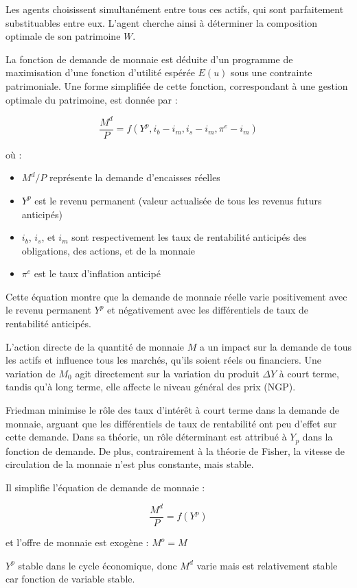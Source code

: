 \documentclass[a4paper, 12pt]{report}
\begin{document}
Les agents choisissent simultanément entre tous ces actifs, qui sont parfaitement substituables entre eux. L'agent cherche ainsi à déterminer la composition optimale de son patrimoine \( W \).

La fonction de demande de monnaie est déduite d'un programme de maximisation d'une fonction d'utilité espérée $E(u)$ sous une contrainte patrimoniale. Une forme simplifiée de cette fonction, correspondant à une gestion optimale du patrimoine, est donnée par :

$$\frac{M^d}{P} = f(Y^p, i_b - i_m, i_s - i_m, \pi^e - i_m)$$

où :
\begin{itemize}
	\item $M^d/P$ représente la demande d'encaisses réelles
	\item $Y^p$ est le revenu permanent (valeur actualisée de tous les revenus futurs anticipés)
	\item $i_b$, $i_s$, et $i_m$ sont respectivement les taux de rentabilité anticipés des obligations, des actions, et de la monnaie
	\item $\pi^e$ est le taux d'inflation anticipé
\end{itemize}

Cette équation montre que la demande de monnaie réelle varie positivement avec le revenu permanent $Y^p$ et négativement avec les différentiels de taux de rentabilité anticipés.

L'action directe de la quantité de monnaie \( M \) a un impact sur la demande de tous les actifs et influence tous les marchés, qu'ils soient réels ou financiers. Une variation de \( M_0 \) agit directement sur la variation du produit \( \Delta Y \) à court terme, tandis qu'à long terme, elle affecte le niveau général des prix (NGP).

Friedman minimise le rôle des taux d'intérêt à court terme dans la demande de monnaie, arguant que les différentiels de taux de rentabilité ont peu d'effet sur cette demande. Dans sa théorie, un rôle déterminant est attribué à \( Y_p \) dans la fonction de demande. De plus, contrairement à la théorie de Fisher, la vitesse de circulation de la monnaie n'est plus constante, mais stable.

Il simplifie l'équation de demande de monnaie : 

\[\frac{M^d}{P} = f(Y^p) \]

et l'offre de monnaie est exogène : $M^o = M$

$Y^p$ stable dans le cycle économique, donc $M^d$ varie mais est relativement stable car fonction de variable stable.
\end{document}
